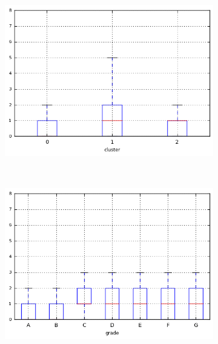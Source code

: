 \begin{anexosenv}
\begin{figure}[t!]
\begin{subfigure}[t]{0.45\textwidth}
            \centerline{\includegraphics[width=1.05\textwidth]{img/inq_last_6mths_by_cluster}}
        \end{subfigure}%
        ~ 
        \begin{subfigure}[t]{0.45\textwidth}
            \centering
   
            \centerline{\includegraphics[width=1.05\textwidth]{img/inq_last_6mths_by_grade}}

        \end{subfigure}
\end{figure}

\begin{figure}[t!]
    \centering
        \caption{\emph{Boxplots} de revol\textunderscore bal }
        \begin{subfigure}[t]{0.45\textwidth}
            \centering


\end{subfigure}
\end{figure}
\end{anexosenv}
